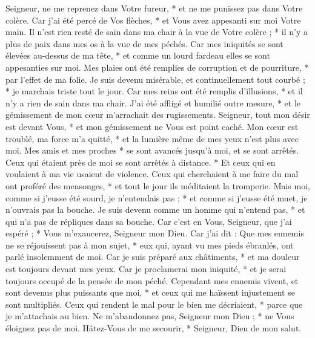  Seigneur, ne me reprenez dans Votre fureur, * et ne me punissez pas dans Votre colère.
\versseparator
 Car j'ai été percé de Vos flèches, * et Vous avez appesanti sur moi Votre main.
\versseparator
 Il n'est rien resté de sain dans ma chair à la vue de Votre colère ; * il n'y a plus de paix dans mes os à la vue de mes péchés.
\versseparator
 Car mes iniquités se sont élevées au-dessus de ma tête, * et comme un lourd fardeau elles se sont appesanties sur moi.
\versseparator
 Mes plaies ont été remplies de corruption et de pourriture, * par l'effet de ma folie.
\versseparator
 Je suis devenu misérable, et continuellement tout courbé ; * je marchais triste tout le jour.
\versseparator
 Car mes reins ont été remplis d'illusions, * et il n'y a rien de sain dans ma chair.
\versseparator
 J'ai été affligé et humilié outre mesure, * et le gémissement de mon cœur m'arrachait des rugissements.
\versseparator
 Seigneur, tout mon désir est devant Vous, * et mon gémissement ne Vous est point caché.
\versseparator
 Mon cœur est troublé, ma force m'a quitté, * et la lumière même de mes yeux n'est plus avec moi.
\versseparator
 Mes amis et mes proches * se sont avancés jusqu'à moi, et se sont arrêtés.
\versseparator
 Ceux qui étaient près de moi se sont arrêtés à distance. * Et ceux qui en voulaient à ma vie usaient de violence.
\versseparator
 Ceux qui cherchaient à me faire du mal ont proféré des mensonges, * et tout le jour ils méditaient la tromperie.
\versseparator
 Mais moi, comme si j'eusse été sourd, je n'entendais pas ; * et comme si j'eusse été muet, je n'ouvrais pas la bouche.
\versseparator
 Je suis devenu comme un homme qui n'entend pas, * et qui n'a pas de répliques dans sa bouche.
\versseparator
 Car c'est en Vous, Seigneur, que j'ai espéré ; * Vous m'exaucerez, Seigneur mon Dieu.
\versseparator
 Car j'ai dit : Que mes ennemis ne se réjouissent pas à mon sujet, * eux qui, ayant vu mes pieds ébranlés, ont parlé insolemment de moi.
\versseparator
 Car je suis préparé aux châtiments, * et ma douleur est toujours devant mes yeux.
\versseparator
 Car je proclamerai mon iniquité, * et je serai toujours occupé de la pensée de mon péché.
\versseparator
 Cependant mes ennemis vivent, et sont devenus plus puissants que moi, * et ceux qui me haïssent injustement se sont multipliés.
\versseparator
 Ceux qui rendent le mal pour le bien me décriaient, * parce que je m'attachais au bien.
\versseparator
 Ne m'abandonnez pas, Seigneur mon Dieu ; * ne Vous éloignez pas de moi.
\versseparator
 Hâtez-Vous de me secourir, * Seigneur, Dieu de mon salut.